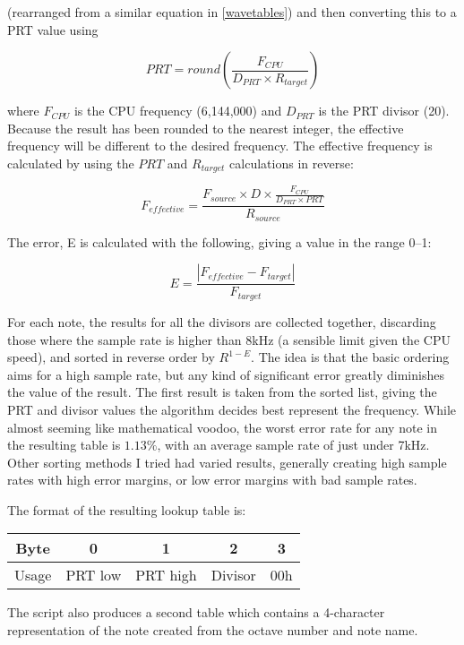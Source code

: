 (rearranged from a similar equation in \ref{wavetables}) and then converting this to a PRT value 
using

\[PRT = round\left(\frac{F_{CPU}}{D_{PRT}\times{}R_{target}}\right)\]

where $F_{CPU}$ is the CPU frequency (6,144,000) and $D_{PRT}$ is the PRT divisor (20).  Because the 
result has been rounded to the nearest integer, the effective frequency will be different to the 
desired frequency.  The effective frequency is calculated by using the $PRT$ and $R_{target}$ 
calculations in reverse:

\[F_{effective} = \frac{F_{source}\times{}D\times{}\frac{F_{CPU}}{D_{PRT}\times{}PRT}}{R_{source}}\]

The error, E is calculated with the following, giving a value in the range 0--1:

\[E = \frac{\left|F_{effective} - F_{target}\right|}{F_{target}}\]

For each note, the results for all the divisors are collected together, discarding those where the 
sample rate is higher than 8kHz (a sensible limit given the CPU speed), and sorted in reverse order 
by $R^{1-E}$.  The idea is that the basic ordering aims for a high sample rate, but any kind of 
significant error greatly diminishes the value of the result.  The first result is taken from the 
sorted list, giving the PRT and divisor values the algorithm decides best represent the frequency.  
While almost seeming like mathematical voodoo, the worst error rate for any note in the resulting 
table is $1.13\%$, with an average sample rate of just under 7kHz.  Other sorting methods I tried 
had varied results, generally creating high sample rates with high error margins, or low error 
margins with bad sample rates.

The format of the resulting lookup table is:
\begin{nowordcount}
\begin{center}
\begin{tabular}{c | c | c | c | c}
Byte & 0 & 1 & 2 & 3 \\
\hline
Usage & PRT low & PRT high & Divisor & 00h \\
\end{tabular}
\end{center}
\end{nowordcount}

The script also produces a second table which contains a 4-character representation of the note 
created from the octave number and note name.
